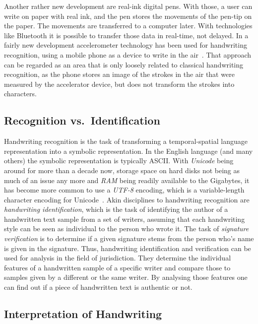 Another rather new development are real-ink digital pens. With those, 
a user can write on paper with real ink, and the pen stores the 
movements of the pen-tip on the paper. The movements are transferred to a 
computer later. 
With technologies like Bluetooth it is possible to transfer those data in 
real-time, not delayed.
In a fairly new development accelerometer technology has been used 
for handwriting recognition, using a mobile phone as a device to write 
in the air~. That approach can be regarded as an area 
that is only loosely related to classical handwriting recognition, 
as the phone stores an image of the strokes in the air that were measured
by the accelerator device, but does not transform the strokes into characters.


\subsection{Recognition vs.\ Identification}
\label{sec:recognitionvsidentification}

Handwriting recognition is the task of transforming a temporal-spatial language 
representation into a symbolic representation. In the English language
(and many others) the symbolic representation is typically ASCII.
With \emph{Unicode} being around for more than a decade now,
storage space on hard disks not being as much of an issue any more and
\emph{RAM} being readily available to the Gigabytes, it has become more 
common to use a \emph{UTF-8} encoding, which is a variable-length character 
encoding for Unicode~.
Akin disciplines to handwriting recognition are 
\emph{handwriting identification}, which is the task of identifying the author
of a handwritten text sample from a set of writers, assuming that each
handwriting style can be seen as individual to the person who wrote it.
The task of \emph{signature verification} is to determine if a given signature
stems from the person who's name is given in the signature.
Thus, handwriting identification and verification can be used for 
analysis in the field of jurisdiction. They determine the individual features
of a handwritten sample of a specific writer and compare those
to samples given by a different or the same writer. By analysing those 
features one can find out if a piece of handwritten text is authentic or not.

\subsection{Interpretation of Handwriting}
\label{sec:interpretationofhandwriting}

